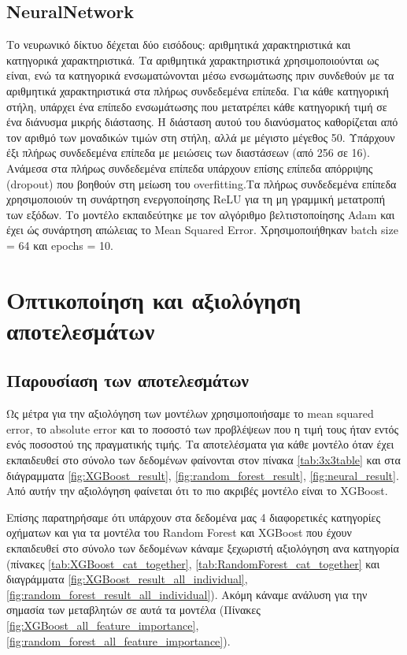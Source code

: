 \documentclass{llncs}
\begin{document}
\subsection{NeuralNetwork}
Το νευρωνικό δίκτυο δέχεται δύο εισόδους: αριθμητικά χαρακτηριστικά και κατηγορικά χαρακτηριστικά.
Τα αριθμητικά χαρακτηριστικά χρησιμοποιούνται ως είναι, 
ενώ τα κατηγορικά ενσωματώνονται μέσω ενσωμάτωσης πριν συνδεθούν με τα αριθμητικά 
χαρακτηριστικά στα πλήρως συνδεδεμένα επίπεδα.
Για κάθε κατηγορική στήλη, υπάρχει ένα επίπεδο ενσωμάτωσης που μετατρέπει κάθε κατηγορική 
τιμή σε ένα διάνυσμα μικρής διάστασης. Η διάσταση αυτού του διανύσματος 
καθορίζεται από τον αριθμό των μοναδικών τιμών στη στήλη, αλλά με μέγιστο μέγεθος 50. 
Υπάρχουν έξι πλήρως συνδεδεμένα επίπεδα με μειώσεις των διαστάσεων (από 256 σε 16). 
Ανάμεσα στα πλήρως συνδεδεμένα επίπεδα υπάρχουν επίσης επίπεδα απόρριψης (dropout) 
που βοηθούν στη μείωση του overfitting.Τα πλήρως συνδεδεμένα επίπεδα χρησιμοποιούν 
τη συνάρτηση ενεργοποίησης ReLU για τη μη γραμμική μετατροπή των εξόδων.
Το μοντέλο εκπαιδεύτηκε με τον αλγόριθμο βελτιστοποίησης Adam και έχει ώς συνάρτηση απώλειας το Mean Squared Error.
Xρησιμοποιήθηκαν batch size = 64 και epochs = 10. 


\section{Oπτικοποίηση και αξιολόγηση αποτελεσμάτων}

\subsection{Παρουσίαση των αποτελεσμάτων}

Ως μέτρα για την αξιολόγηση των μοντέλων χρησιμοποιήσαμε το mean squared error, το absolute error και το ποσοστό των προβλέψεων που η τιμή τους 
ήταν εντός ενός ποσοστού της πραγματικής τιμής. Τα αποτελέσματα για κάθε μοντέλο όταν έχει εκπαιδευθεί στο σύνολο των δεδομένων
φαίνονται στον πίνακα \ref{tab:3x3table} και στα διάγραμματα \ref{fig:XGBoost_result}, 
\ref{fig:random_forest_result}, \ref{fig:neural_result}. Από αυτήν την αξιολόγηση φαίνεται ότι το πιο ακριβές μοντέλο
είναι το XGBoost.

Επίσης παρατηρήσαμε ότι υπάρχουν στα δεδομένα μας 4 διαφορετικές κατηγορίες οχήματων και
για τα μοντέλα του Random Forest και XGBoost που έχουν εκπαιδευθεί στο σύνολο των δεδομένων
κάναμε ξεχωριστή αξιολόγηση ανα κατηγορία 
(πίνακες \ref{tab:XGBoost_cat_together}, \ref{tab:RandomForest_cat_together} 
και διαγράμματα 
\ref{fig:XGBoost_result_all_individual}, \ref{fig:random_forest_result_all_individual}). Ακόμη κάναμε ανάλυση για την σημασία των μεταβλητών σε αυτά τα μοντέλα 
(Πίνακες \ref{fig:XGBoost_all_feature_importance}, 
\ref{fig:random_forest_all_feature_importance}).
\end{document}
